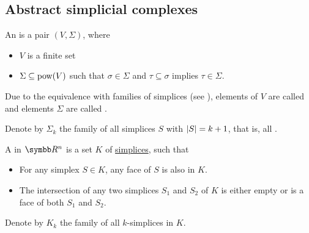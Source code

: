 \subsection{Abstract simplicial complexes}\label{subsec:abstract_simplicial_complexes}

\begin{Definition}\label{def:abstract_simplicial_complex}\cite[definition 2.1]{Carlsson2009}
  An  is a pair \( (V, \Sigma) \), where
  \begin{itemize}
    \item \( V \) is a finite set
    \item \( \Sigma \subseteq \operatorname{pow}(V) \) such that \( \sigma \in \Sigma \) and \( \tau \subseteq \sigma \) implies \( \tau \in \Sigma \).
  \end{itemize}

  Due to the equivalence with families of simplices (see ), elements of \( V \) are called  and elements \( \Sigma \) are called .

  Denote by \( \Sigma_k \) the family of all simplices \( S \) with \( \left\vert S \right\vert = k + 1 \), that is, all .
\end{Definition}

\begin{Definition}\label{def:simplicial_complex}
  A  in \( \BR^n \) is a set \( K \) of \hyperref[def:simplex]{simplices}, such that
  \begin{itemize}
    \item For any simplex \( S \in K \), any face of \( S \) is also in \( K \).
    \item The intersection of any two simplices \( S_1 \) and \( S_2 \) of \( K \) is either empty or is a face of both \( S_1 \) and \( S_2 \).
  \end{itemize}

  Denote by \( K_k \) the family of all \( k \)-simplices in \( K \).
\end{Definition}

